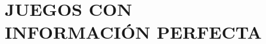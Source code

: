 \chapter[JUEGOS CON INFORMACIÓN PERFECTA]{JUEGOS CON \\ INFORMACIÓN PERFECTA}
\printchaptertableofcontents